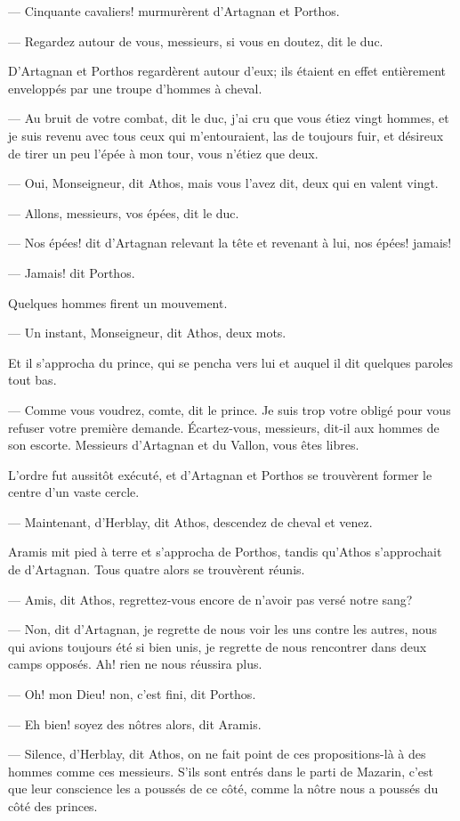 — Cinquante cavaliers! murmurèrent d'Artagnan et Porthos.

— Regardez autour de vous, messieurs, si vous en doutez, dit le duc.

D'Artagnan et Porthos regardèrent autour d'eux; ils étaient en effet entièrement enveloppés par une troupe d'hommes à cheval.

— Au bruit de votre combat, dit le duc, j'ai cru que vous étiez vingt hommes, et je suis revenu avec tous ceux qui m'entouraient, las de toujours fuir, et désireux de tirer un peu l'épée à mon tour, vous n'étiez que deux.

— Oui, Monseigneur, dit Athos, mais vous l'avez dit, deux qui en valent vingt.

— Allons, messieurs, vos épées, dit le duc.

— Nos épées! dit d'Artagnan relevant la tête et revenant à lui, nos épées! jamais!

— Jamais! dit Porthos.

Quelques hommes firent un mouvement.

— Un instant, Monseigneur, dit Athos, deux mots.

Et il s'approcha du prince, qui se pencha vers lui et auquel il dit quelques paroles tout bas.

— Comme vous voudrez, comte, dit le prince. Je suis trop votre obligé pour vous refuser votre première demande. Écartez-vous, messieurs, dit-il aux hommes de son escorte. Messieurs d'Artagnan et du Vallon, vous êtes libres.

L'ordre fut aussitôt exécuté, et d'Artagnan et Porthos se trouvèrent former le centre d'un vaste cercle.

— Maintenant, d'Herblay, dit Athos, descendez de cheval et venez.

Aramis mit pied à terre et s'approcha de Porthos, tandis qu'Athos s'approchait de d'Artagnan. Tous quatre alors se trouvèrent réunis.

— Amis, dit Athos, regrettez-vous encore de n'avoir pas versé notre sang?

— Non, dit d'Artagnan, je regrette de nous voir les uns contre les autres, nous qui avions toujours été si bien unis, je regrette de nous rencontrer dans deux camps opposés. Ah! rien ne nous réussira plus.

— Oh! mon Dieu! non, c'est fini, dit Porthos.

— Eh bien! soyez des nôtres alors, dit Aramis.

— Silence, d'Herblay, dit Athos, on ne fait point de ces propositions-là à des hommes comme ces messieurs. S'ils sont entrés dans le parti de Mazarin, c'est que leur conscience les a poussés de ce côté, comme la nôtre nous a poussés du côté des princes.

